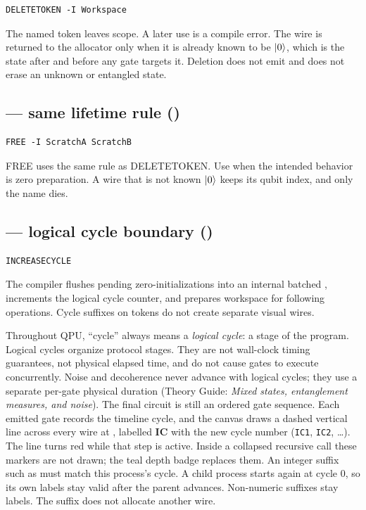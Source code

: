 \begin{lstlisting}
DELETETOKEN -I Workspace
\end{lstlisting}
The named token leaves scope. A later use is a compile error. The wire is
returned to the allocator only when it is already known to be $\lvert 0\rangle$, which
is the state after  and before any gate targets it. Deletion
does not emit  and does not erase an unknown or entangled state.

\subsection{ --- same lifetime rule (\implemented)}

\begin{lstlisting}
FREE -I ScratchA ScratchB
\end{lstlisting}
FREE uses the same rule as DELETETOKEN. Use  when the
intended behavior is zero preparation. A wire that is not known $\lvert 0\rangle$ keeps
its qubit index, and only the name dies.

\subsection{ --- logical cycle boundary (\implemented)}

\begin{lstlisting}
INCREASECYCLE
\end{lstlisting}
The compiler flushes pending zero-initializations into an internal batched
, increments the logical cycle counter, and prepares workspace for
following operations. Cycle suffixes on tokens do not create separate visual
wires.

Throughout QPU, ``cycle'' always means a \emph{logical cycle}: a stage of the
program. Logical cycles organize protocol stages. They are not wall-clock
timing guarantees, not physical elapsed time, and do not cause gates to
execute concurrently. Noise and decoherence never advance with logical cycles;
they use a separate per-gate physical duration (Theory Guide: \emph{Mixed
states, entanglement measures, and noise}). The final circuit is still an
ordered gate sequence. Each emitted gate records the timeline cycle, and the
canvas draws a dashed vertical line across every wire at
, labelled \textbf{IC} with the new cycle number
(\texttt{IC1}, \texttt{IC2}, \ldots). The line turns red while that step is
active. Inside a collapsed recursive call these markers are not drawn; the
teal depth badge replaces them. An integer suffix such as
 must match this process's cycle. A child process starts again at
cycle 0, so its own  labels stay valid after the parent advances.
Non-numeric suffixes stay labels. The suffix does not allocate another wire.

